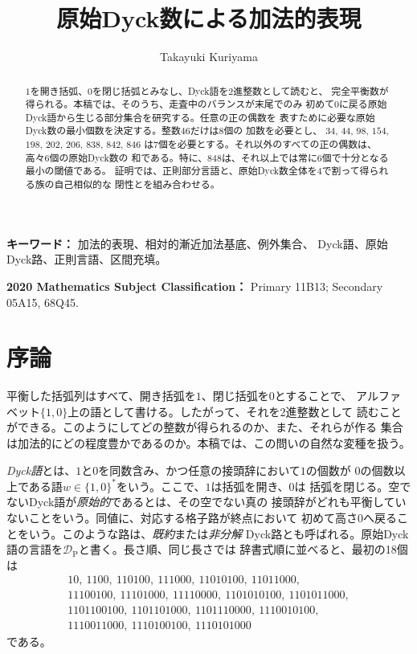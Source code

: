 \documentclass[12pt]{ltjsarticle}
\title{原始Dyck数による加法的表現}
\author{Takayuki Kuriyama}
\date{}
\theoremstyle{plain}
\newcommand{\DP}{\mathcal{D}_{\mathrm{P}}}
\begin{document}
\maketitle

\begin{abstract}
$1$を開き括弧、$0$を閉じ括弧とみなし、Dyck語を2進整数として読むと、
完全平衡数が得られる。本稿では、そのうち、走査中のバランスが末尾でのみ
初めて0に戻る原始Dyck語から生じる部分集合を研究する。任意の正の偶数を
表すために必要な原始Dyck数の最小個数を決定する。整数$46$だけは8個の
加数を必要とし、
$34$, $44$, $98$, $154$, $198$, $202$, $206$, $838$, $842$, $846$
は7個を必要とする。それ以外のすべての正の偶数は、高々6個の原始Dyck数の
和である。特に、$848$は、それ以上では常に6個で十分となる最小の閾値である。
証明では、正則部分言語と、原始Dyck数全体を4で割って得られる族の自己相似的な
閉性とを組み合わせる。
\end{abstract}

\noindent\textbf{キーワード：} 加法的表現、相対的漸近加法基底、例外集合、
Dyck語、原始Dyck路、正則言語、区間充填。

\noindent\textbf{2020 Mathematics Subject Classification：} Primary 11B13;
Secondary 05A15, 68Q45.

\section{序論}\label{sec:introduction}

平衡した括弧列はすべて、開き括弧を$1$、閉じ括弧を$0$とすることで、
アルファベット$\{1,0\}$上の語として書ける。したがって、それを2進整数として
読むことができる。このようにしてどの整数が得られるのか、また、それらが作る
集合は加法的にどの程度豊かであるのか。本稿では、この問いの自然な変種を扱う。

\emph{Dyck語}とは、$1$と$0$を同数含み、かつ任意の接頭辞において$1$の個数が
$0$の個数以上である語$w\in\{1,0\}^*$をいう。ここで、$1$は括弧を開き、$0$は
括弧を閉じる。空でないDyck語が\emph{原始的}であるとは、その空でない真の
接頭辞がどれも平衡していないことをいう。同値に、対応する格子路が終点において
初めて高さ0へ戻ることをいう。このような路は、\emph{既約}または\emph{非分解}
Dyck路とも呼ばれる。原始Dyck語の言語を$\DP$と書く。長さ順、同じ長さでは
辞書式順に並べると、最初の18個は
\[
\begin{gathered}
10,\ 1100,\ 110100,\ 111000,\ 11010100,\ 11011000,\\
11100100,\ 11101000,\ 11110000,\ 1101010100,\ 1101011000,\\
1101100100,\ 1101101000,\ 1101110000,\ 1110010100,\\
1110011000,\ 1110100100,\ 1110101000
\end{gathered}
\]
である。
\end{document}
